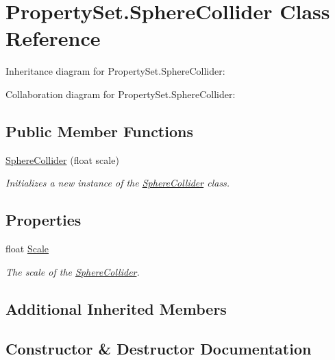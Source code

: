 \hypertarget{class_property_set_1_1_sphere_collider}{}\section{Property\+Set.\+Sphere\+Collider Class Reference}
\label{class_property_set_1_1_sphere_collider}


Inheritance diagram for Property\+Set.\+Sphere\+Collider\+:


Collaboration diagram for Property\+Set.\+Sphere\+Collider\+:
\subsection*{Public Member Functions}
\begin{DoxyCompactItemize}
\item 
\hyperlink{class_property_set_1_1_sphere_collider_ae5483127a8dbe767f2d068233e304e30}{Sphere\+Collider} (float scale)
\begin{DoxyCompactList}\small\item\em Initializes a new instance of the \hyperlink{class_property_set_1_1_sphere_collider}{Sphere\+Collider} class. \end{DoxyCompactList}\end{DoxyCompactItemize}
\subsection*{Properties}
\begin{DoxyCompactItemize}
\item 
float \hyperlink{class_property_set_1_1_sphere_collider_a1dbdd1e192db29b1a749679473cb4e5d}{Scale}
\begin{DoxyCompactList}\small\item\em The scale of the \hyperlink{class_property_set_1_1_sphere_collider}{Sphere\+Collider}. \end{DoxyCompactList}\end{DoxyCompactItemize}
\subsection*{Additional Inherited Members}


\subsection{Constructor \& Destructor Documentation}
\mbox{\label{class_property_set_1_1_sphere_collider_ae5483127a8dbe767f2d068233e304e30}} 
